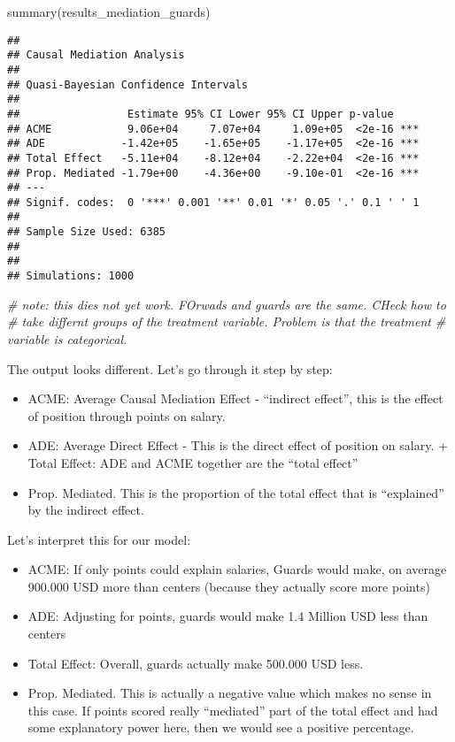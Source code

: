 \documentclass[
]{book}
\newenvironment{Shaded}{\begin{snugshade}}{\end{snugshade}}
\newcommand{\CommentTok}[1]{\textcolor[rgb]{0.56,0.35,0.01}{\textit{#1}}}
\newcommand{\FunctionTok}[1]{\textcolor[rgb]{0.00,0.00,0.00}{#1}}
\newcommand{\NormalTok}[1]{#1}
\providecommand{\tightlist}{%
  \setlength{\itemsep}{0pt}\setlength{\parskip}{0pt}}
\begin{document}
\begin{Shaded}
\begin{Highlighting}[]
\FunctionTok{summary}\NormalTok{(results\_mediation\_guards)}
\end{Highlighting}
\end{Shaded}

\begin{verbatim}
## 
## Causal Mediation Analysis 
## 
## Quasi-Bayesian Confidence Intervals
## 
##                 Estimate 95% CI Lower 95% CI Upper p-value    
## ACME            9.06e+04     7.07e+04     1.09e+05  <2e-16 ***
## ADE            -1.42e+05    -1.65e+05    -1.17e+05  <2e-16 ***
## Total Effect   -5.11e+04    -8.12e+04    -2.22e+04  <2e-16 ***
## Prop. Mediated -1.79e+00    -4.36e+00    -9.10e-01  <2e-16 ***
## ---
## Signif. codes:  0 '***' 0.001 '**' 0.01 '*' 0.05 '.' 0.1 ' ' 1
## 
## Sample Size Used: 6385 
## 
## 
## Simulations: 1000
\end{verbatim}

\begin{Shaded}
\begin{Highlighting}[]
\CommentTok{\# note: this dies not yet work. FOrwads and guards are the same. CHeck how to }
\CommentTok{\# take differnt groups of the treatment variable. Problem is that the treatment}
\CommentTok{\# variable is categorical.}
\end{Highlighting}
\end{Shaded}

The output looks different. Let's go through it step by step:

\begin{itemize}
\tightlist
\item
  ACME: Average Causal Mediation Effect - ``indirect effect'', this is the effect of position through points on salary.\\
\item
  ADE: Average Direct Effect - This is the direct effect of position on salary. + Total Effect: ADE and ACME together are the ``total effect''\\
\item
  Prop. Mediated. This is the proportion of the total effect that is ``explained'' by the indirect effect.
\end{itemize}

Let's interpret this for our model:

\begin{itemize}
\tightlist
\item
  ACME: If only points could explain salaries, Guards would make, on average 900.000 USD more than centers (because they actually score more points)
\item
  ADE: Adjusting for points, guards would make 1.4 Million USD less than centers
\item
  Total Effect: Overall, guards actually make 500.000 USD less.
\item
  Prop. Mediated. This is actually a negative value which makes no sense in this case. If points scored really ``mediated'' part of the total effect and had some explanatory power here, then we would see a positive percentage.
\end{itemize}
\end{document}
